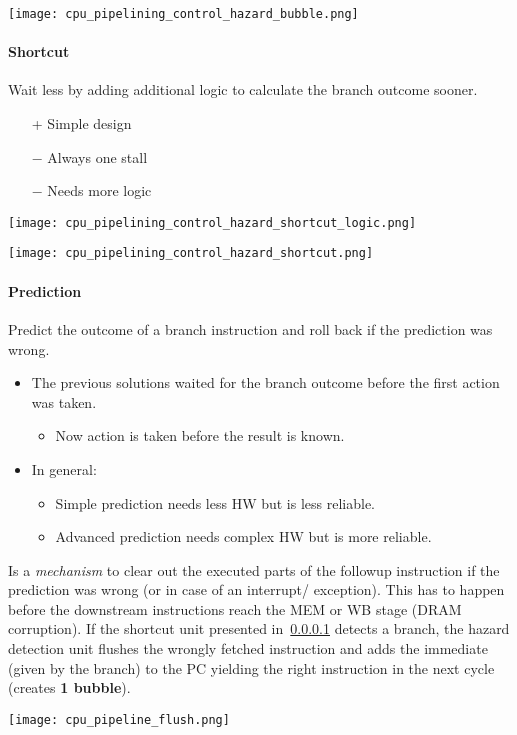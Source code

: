 \texttt{[image: cpu\_pipelining\_control\_hazard\_bubble.png]}

\paragraph{Shortcut}\label{shortcut}

Wait less by adding additional logic to calculate the branch outcome sooner.

\begin{itemize}
    \item[+] Simple design
    \item[$-$] Always one stall
    \item[$-$] Needs more logic
\end{itemize}

\texttt{[image: cpu\_pipelining\_control\_hazard\_shortcut\_logic.png]}

\texttt{[image: cpu\_pipelining\_control\_hazard\_shortcut.png]}

\paragraph{Prediction}\label{prediction}
Predict the outcome of a branch instruction and roll back if the prediction was wrong.
\begin{itemize}
    \item The previous solutions waited for the branch outcome before the first action was taken.
          \begin{itemize}
              \item Now action is taken before the result is known.
          \end{itemize}
    \item In general:
          \begin{itemize}
              \item Simple prediction needs less HW but is less reliable.
              \item Advanced prediction needs complex HW but is more reliable.
          \end{itemize}
\end{itemize}

\newpar{}

Is a \textit{mechanism} to clear out the executed parts of the followup instruction if the prediction was wrong (or in case of an interrupt/ exception). This has to happen before the downstream instructions reach the MEM or WB stage (DRAM corruption). If the shortcut unit presented in~\ref{shortcut} detects a branch, the hazard detection unit flushes the wrongly fetched instruction and adds the immediate (given by the branch) to the PC yielding the right instruction in the next cycle (creates \textbf{1 bubble}).
\begin{center}
    \texttt{[image: cpu\_pipeline\_flush.png]}
\end{center}
\newpar{}

